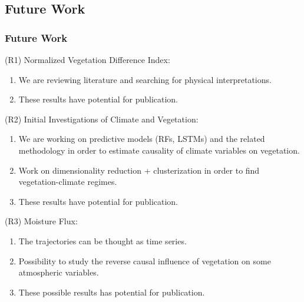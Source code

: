\documentclass[11pt]{beamer}
\begin{document}
\subsection{Future Work}

\begin{frame}
  \frametitle{\normalsize{\textbf{
        Future Work
  }}}

  \scriptsize{
    
    \textbullet \: (R1) Normalized Vegetation Difference Index:

    \begin{enumerate}

    \item We are reviewing literature and searching for physical
      interpretations.

    \item These results have potential for publication.
      
    \end{enumerate}
      
    \textbullet \: (R2) Initial Investigations of Climate and Vegetation:

    \begin{enumerate}

    \item We are working on predictive models (RFs, LSTMs) and the related
      methodology in order to estimate  causality of climate variables on
      vegetation. 
      
    \item Work on dimensionality reduction + clusterization in order to find
      vegetation-climate regimes. 
      
    \item These results have potential for publication.      
      
    \end{enumerate}
    
    \textbullet \: (R3) Moisture Flux:

    \begin{enumerate}

    \item The trajectories can be thought as time series.
      
    \item Possibility to study the reverse causal influence of vegetation on
      some atmospheric variables.

    \item These possible results has potential for publication.
      
    \end{enumerate}
  }
  
\end{frame}
\end{document}

